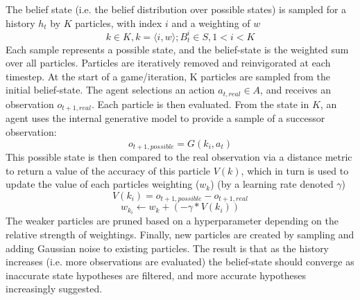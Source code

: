 \newline \newline
The belief state (i.e. the belief distribution over possible states) is sampled for a history $h_t$ by $K$ particles, with index $i$ and a weighting of $w$ 
\begin{equation}
    k \in K, k = \langle i, w \rangle; B^i_t \in S, 1 < i < K    
\end{equation}
Each sample represents a possible state, and the belief-state is the weighted sum over all particles. 
\newline \newline
Particles are iteratively removed and reinvigorated at each timestep. At the start of a game/iteration, K particles are sampled from the initial belief-state. The agent selections an action $a_{t, real} \in A$, and receives an observation $o_{t+1,real}$. 
\newline \newline
Each particle is then evaluated. From the state in $K$, an agent uses the internal generative model to provide a sample of a successor observation: 
\begin{equation}
    o_{t+1, possible} = G(k_i, a_t)
\end{equation}
This possible state is then compared to the real observation via a distance metric to return a value of the accuracy of this particle $V(k)$, which in turn is used to update the value of each particles weighting ($w_k$) (by a learning rate denoted $\gamma$) 
\begin{equation}
    V(k_i) = o_{t+1, possible} - o_{t+1, real}
\end{equation}
\begin{equation}
    w_{k_i} \leftarrow w_k + (- \gamma * V(k_i))
\end{equation}
The weaker particles are pruned based on a hyperparameter depending on the relative strength of weightings. Finally, new particles are created by sampling and adding Gaussian noise to existing particles. 
\newline \newline
The result is that as the history increases (i.e. more observations are evaluated) the belief-state should converge as inaccurate state hypotheses are filtered, and more accurate hypotheses increasingly suggested. 

